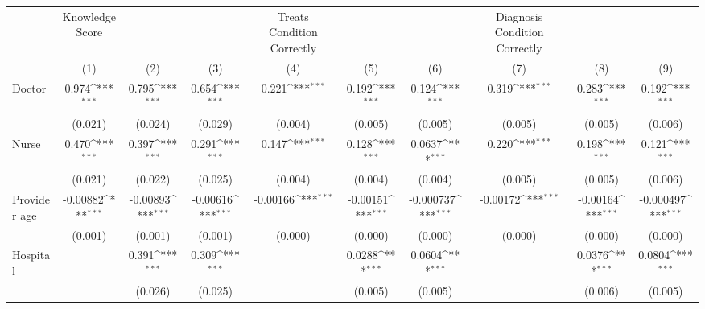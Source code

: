 {
\def\sym#1{\ifmmode^{#1}\else\(^{#1}\)\fi}
\begin{tabular}{l*{9}{c}}
\hline\hline
                &Knowledge Score         &                  &                  &Treats Condition Correctly         &                  &                  &Diagnosis Condition Correctly         &                  &                  \\
                &\multicolumn{1}{c}{(1)}         &\multicolumn{1}{c}{(2)}         &\multicolumn{1}{c}{(3)}         &\multicolumn{1}{c}{(4)}         &\multicolumn{1}{c}{(5)}         &\multicolumn{1}{c}{(6)}         &\multicolumn{1}{c}{(7)}         &\multicolumn{1}{c}{(8)}         &\multicolumn{1}{c}{(9)}         \\
\hline
Doctor          &    0.974\sym{***}&    0.795\sym{***}&    0.654\sym{***}&    0.221\sym{***}&    0.192\sym{***}&    0.124\sym{***}&    0.319\sym{***}&    0.283\sym{***}&    0.192\sym{***}\\
                &  (0.021)         &  (0.024)         &  (0.029)         &  (0.004)         &  (0.005)         &  (0.005)         &  (0.005)         &  (0.005)         &  (0.006)         \\
Nurse           &    0.470\sym{***}&    0.397\sym{***}&    0.291\sym{***}&    0.147\sym{***}&    0.128\sym{***}&   0.0637\sym{***}&    0.220\sym{***}&    0.198\sym{***}&    0.121\sym{***}\\
                &  (0.021)         &  (0.022)         &  (0.025)         &  (0.004)         &  (0.004)         &  (0.004)         &  (0.005)         &  (0.005)         &  (0.006)         \\
Provider age    & -0.00882\sym{***}& -0.00893\sym{***}& -0.00616\sym{***}& -0.00166\sym{***}& -0.00151\sym{***}&-0.000737\sym{***}& -0.00172\sym{***}& -0.00164\sym{***}&-0.000497\sym{***}\\
                &  (0.001)         &  (0.001)         &  (0.001)         &  (0.000)         &  (0.000)         &  (0.000)         &  (0.000)         &  (0.000)         &  (0.000)         \\
Hospital        &                  &    0.391\sym{***}&    0.309\sym{***}&                  &   0.0288\sym{***}&   0.0604\sym{***}&                  &   0.0376\sym{***}&   0.0804\sym{***}\\
                &                  &  (0.026)         &  (0.025)         &                  &  (0.005)         &  (0.005)         &                  &  (0.006)         &  (0.005)         \\

\end{tabular}}
